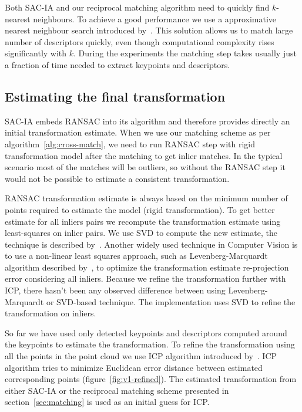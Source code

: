 Both \gls{SAC-IA} and our reciprocal matching algorithm need to quickly find $k$-nearest neighbours. To achieve a good performance we use a approximative nearest neighbour search introduced by~\citet{muja2014flann}. This solution allows us to match large number of descriptors quickly, even though computational complexity rises significantly with $k$. During the experiments the matching step takes usually just a fraction of time needed to extract keypoints and descriptors.

\subsection{Estimating the final transformation}
\label{sec:final-estimation}

\gls{SAC-IA} embeds \gls{RANSAC} into its algorithm and therefore provides directly an initial transformation estimate. When we use our matching scheme as per algorithm~\ref{alg:cross-match}, we need to run \gls{RANSAC} step with rigid transformation model after the matching to get inlier matches. In the typical scenario most of the matches will be outliers, so without the \gls{RANSAC} step it would not be possible to estimate a consistent transformation.

\gls{RANSAC} transformation estimate is always based on the minimum number of points required to estimate the model (rigid transformation). To get better estimate for all inliers pairs we recompute the transformation estimate using least-squares on inlier pairs. We use \gls{SVD} to compute the new estimate, the technique is described by~\citet{golub1970svd}. Another widely used technique in Computer Vision is to use a non-linear least squares approach, such as Levenberg-Marquardt algorithm described by~\citet{more1978levmarq}, to optimize the transformation estimate re-projection error considering all inliers. Because we refine the transformation further with \gls{ICP}, there hasn't been any observed difference between using Levenberg-Marquardt or \gls{SVD}-based technique. The implementation uses \gls{SVD} to refine the transformation on inliers.

So far we have used only detected keypoints and descriptors computed around the keypoints to estimate the transformation. To refine the transformation using all the points in the point cloud we use \gls{ICP} algorithm introduced by~\citet{besl1992icp}. \gls{ICP} algorithm tries to minimize Euclidean error distance between estimated corresponding points (figure~\ref{fig:v1-refined}). The estimated transformation from either \gls{SAC-IA} or the reciprocal matching scheme presented in section~\ref{sec:matching} is used as an initial guess for \gls{ICP}.


